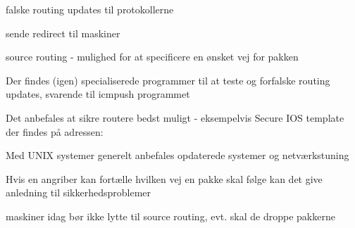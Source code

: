 \documentclass[Screen16to9,17pt,footrule]{foils}
\begin{document}

\begin{list1}
  \item falske routing updates til protokollerne
\item sende redirect til maskiner
\item source routing - mulighed for at specificere en ønsket vej for
  pakken
\item Der findes (igen) specialiserede programmer til at teste og
  forfalske routing updates, svarende til icmpush programmet
\item Det anbefales at sikre routere bedst muligt - eksempelvis
Secure IOS template der findes på adressen:\\
{\small {}}
\item Med UNIX systemer generelt anbefales opdaterede systemer og netværkstuning
\end{list1}



\begin{list1}
\item Hvis en angriber kan fortælle hvilken vej en pakke skal følge
  kan det give anledning til sikkerhedsproblemer
\item maskiner idag bør ikke lytte til source routing, evt. skal de
  droppe pakkerne
\end{list1}
\end{document}
